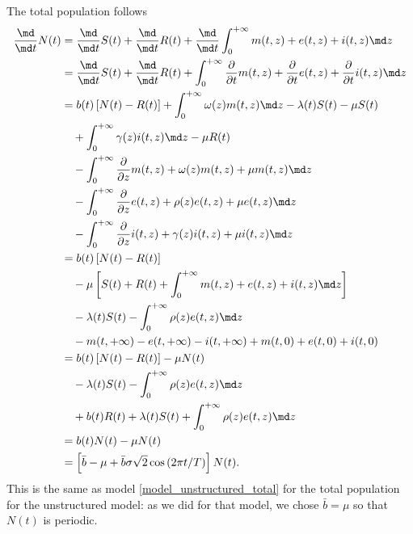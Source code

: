 \documentclass{jpmarticle}
\begin{document}
The total population follows
\begin{equation}
  \begin{split}
    \frac{\md}{\md t} N(t)
    &= \frac{\md}{\md t} S(t)
    + \frac{\md}{\md t} R(t)
    + \frac{\md}{\md t} \int_0^{+\infty} m(t, z) + e(t, z) + i(t, z) \md z
    \\
    &= \frac{\md}{\md t} S(t)
    + \frac{\md}{\md t} R(t)
    + \int_0^{+\infty} \frac{\partial}{\partial t} m(t, z)
    + \frac{\partial}{\partial t} e(t, z)
    + \frac{\partial}{\partial t} i(t, z) \md z
    \\
    &=
    b(t) \left[N(t) - R(t)\right]
    + \int_0^{+\infty} \omega(z) m(t, z) \md z
    - \lambda(t) S(t) - \mu S(t)
    \\ & \quad {}
    + \int_0^{+\infty} \gamma(z) i(t, z) \md z
    - \mu R(t)
    \\ & \quad {}
    - \int_0^{+\infty}
    \frac{\partial}{\partial z} m(t, z)
    + \omega(z) m(t, z)
    + \mu m(t, z)
    \md z
    \\ & \quad {}
    - \int_0^{+\infty}
    \frac{\partial}{\partial z} e(t, z)
    + \rho(z) e(t, z)
    + \mu e(t, z)
    \md z
    \\ & \quad {}
    - \int_0^{+\infty}
    \frac{\partial}{\partial z} i(t, z)
    + \gamma(z) i(t, z)
    + \mu i(t, z)
    \md z
    \\
    &=
    b(t) \left[N(t) - R(t)\right]
    \\ & \quad {}
    - \mu \left[
      S(t) + R(t)
      + \int_0^{+\infty}
      m(t, z) + e(t, z) + i(t, z)
      \md z
    \right]
    \\ & \quad {}
    - \lambda(t) S(t)
    - \int_0^{+\infty}
    \rho(z) e(t, z)
    \md z
    \\ & \quad {}
    - m(t, +\infty) - e(t, +\infty) - i(t, +\infty)
    + m(t, 0) + e(t, 0) + i(t, 0)
    \\
    &=
    b(t) \left[N(t) - R(t)\right]
    - \mu N(t)
    \\ & \quad {}
    - \lambda(t) S(t)
    - \int_0^{+\infty}
    \rho(z) e(t, z)
    \md z
    \\ & \quad {}
    + b(t) R(t)
    + \lambda(t) S(t)
    + \int_0^{+\infty} \rho(z) e(t, z) \md z
    \\
    &= b(t) N(t) - \mu N(t)
    \\
    &= \left[
      \bar{b} - \mu
      + \bar{b} \sigma \sqrt{2} \cos\left(2 \pi t / T\right)
    \right] N(t).
  \end{split}
\end{equation}
This is the same as model \eqref{model_unstructured_total} for the
total population for the unstructured model: as we did for that model,
we chose $\bar{b} = \mu$ so that $N(t)$ is periodic.
\end{document}
